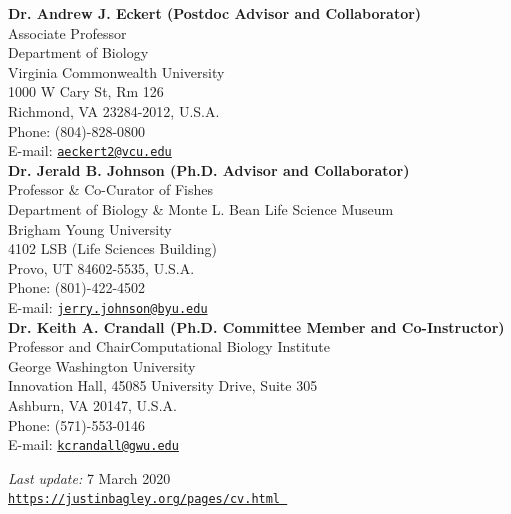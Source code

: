 \documentclass[margin,line]{res}
\begin{document}
\begin{resume}
\textbf{Dr. Andrew J. Eckert (Postdoc Advisor and Collaborator)} \\
Associate Professor \\
Department of Biology \\
Virginia Commonwealth University \\
1000 W Cary St, Rm 126 \\
Richmond, VA 23284-2012, U.S.A. \\
Phone: (804)-828-0800	 \\
E-mail: \href{mailto:aeckert2@vcu.edu}{\tt aeckert2@vcu.edu} \\

\textbf{Dr. Jerald B. Johnson (Ph.D. Advisor and Collaborator)} \\
Professor \& Co-Curator of Fishes \\
Department of Biology \& Monte L. Bean Life Science Museum \\
Brigham Young University \\
4102 LSB (Life Sciences Building) \\
Provo, UT 84602-5535, U.S.A. \\
Phone: (801)-422-4502	 \\
E-mail: \href{mailto:jerry.johnson@byu.edu}{\tt jerry.johnson@byu.edu}  \\

\textbf{Dr. Keith A. Crandall (Ph.D. Committee Member and Co-Instructor)} \\
Professor and Chair\textemdash Computational Biology Institute \\
George Washington University \\
Innovation Hall, 45085 University Drive, Suite 305 \\
Ashburn, VA 20147, U.S.A. \\
Phone: (571)-553-0146 \\
E-mail: \href{mailto:kcrandall@gwu.edu}{\tt kcrandall@gwu.edu} \\


\bigskip
\bigskip
\bigskip
\bigskip
\bigskip


\centering
\textit{Last update:} 7 March 2020 \\
\href{https://justinbagley.org/pages/cv.html }{\tt https://justinbagley.org/pages/cv.html }


\end{resume}
\end{document}
